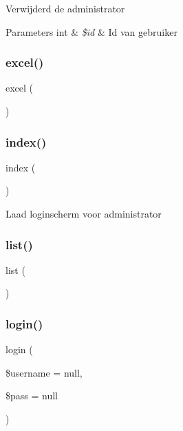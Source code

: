 Verwijderd de administrator 
\begin{DoxyParams}[1]{Parameters}
int & {\em \$id} & Id van gebruiker \\
\hline
\end{DoxyParams}
\mbox{\label{class_admin_ab619c12069c76b755a2ceae543d527fe}} 
\subsubsection{\texorpdfstring{excel()}{excel()}}
{\footnotesize\ttfamily excel (\begin{DoxyParamCaption}{ }\end{DoxyParamCaption})}

\mbox{\label{class_admin_a149eb92716c1084a935e04a8d95f7347}} 
\subsubsection{\texorpdfstring{index()}{index()}}
{\footnotesize\ttfamily index (\begin{DoxyParamCaption}{ }\end{DoxyParamCaption})}

Laad loginscherm voor administrator \mbox{\label{class_admin_a635cee6ce0ca514b13a5e5a9030e5ca8}} 
\subsubsection{\texorpdfstring{list()}{list()}}
{\footnotesize\ttfamily list (\begin{DoxyParamCaption}{ }\end{DoxyParamCaption})}

\mbox{\label{class_admin_a3ea73f2d243749d401f168a6dc356528}} 
\subsubsection{\texorpdfstring{login()}{login()}}
{\footnotesize\ttfamily login (\begin{DoxyParamCaption}\item[{}]{\$username = {\ttfamily null},  }\item[{}]{\$pass = {\ttfamily null} }\end{DoxyParamCaption})}

